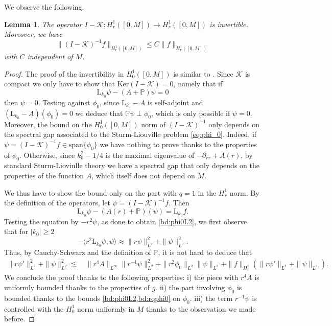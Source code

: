 \documentclass[11pt,reqno]{amsproc}
\def\de{{\partial}}
\newcommand{\rmL}{\mathrm{L}}
\newcommand{\cK}{\mathcal{K}}
\newtheorem{lemma}[proposition]{Lemma}
\theoremstyle{definition}
\theoremstyle{definition}
\numberwithin{equation}{section}
\begin{document}
 We observe the following. 
 \begin{lemma}
 \label{lemma:I-K}
     The operator $I-\cK:H^{1}_r([0,M])\to H^1_r([0,M])$ is invertible. Moreover, we have 
     \begin{equation}
     \|(I-\cK)^{-1}f\|_{H^1_r([0,M])}\leq C\|f\|_{H^1_r([0,M])}     \end{equation} with $C$ independent of $M$.
 \end{lemma}
 \begin{proof}
     The proof of the invertibility in $H^1_0([0,M])$ is similar to \cite[Lemma 3]{kumar2023simple}. Since $\cK$ is compact we only have to show that $\mathrm{Ker}(I-\cK)=0$, namely that if 
     \begin{equation}
         \rmL_{k_0}\psi-(A+\mathbb{P})\psi=0
     \end{equation}
     then $\psi=0$. Testing against $\phi_0$, since $\rmL_{k_0}-A$ is self-adjoint and $(\rmL_{k_0}-A)(\phi_0)=0$ we deduce that $\mathbb{P}\psi\perp \phi_0$, which is only possible if $\psi=0$. Moreover, the bound on the  $H^1_0([0,M])$ norm of $(I-\cK)^{-1}$ only depends on the spectral gap associated to the Sturm-Liouville problem \cref{eq:phi_0}. Indeed, if $\psi=(I-\cK)^{-1}f\in \mathrm{span}\{\phi_0\}$ we have nothing to prove thanks to the properties of $\phi_0$. Otherwise, since $k_0^2-1/4$ is the maximal eigenvalue of $-\de_{rr}+A(r)$, by standard Sturm-Lioviulle theory \cite{Kong96} we have a spectral gap that only depends on the properties of the function $A$, which itself does not depend on $M$.
     
     We thus have to show the bound only on the part with $q=1$ in the $H^1_r$ norm. By the definition of the operators,  let $\psi=(I-\cK)^{-1}f$. Then
\begin{equation}
         \rmL_{k_0}\psi-(A(r)+\mathbb{P})(\psi)=\rmL_{k_0}f.
     \end{equation}
 Testing the equation by $-r^{2}\psi$, as done to obtain \cref{bd:phi0L2}, we first observe that for $|k_0|\geq 2$
 \begin{equation}
     -\langle r^{2}\rmL_{k_0}\psi,\psi\rangle \approx \|r\psi\|_{L^2}^2+\|\psi\|_{L^2}^2.
 \end{equation}
 Thus, by Cauchy-Schwarz and the definition of $\mathbb{P}$, it is not hard to deduce that 
 \begin{align}
\|r\psi'\|_{L^2}^2+\|\psi\|_{L^2}^2\lesssim \, &\|r^4A\|_{L^\infty}\|r^{-1}\psi\|_{L^2}^2+\|r^2\phi_0\|_{L^2}\|\psi\|_{L^2}+\|f\|_{H^1_r}(\|r\psi'\|_{L^2}+\|\psi\|_{L^2}).
 \end{align}
 We conclude the proof thanks to the following properties: i)  the piece with $r^4A$ is uniformly bounded thanks to the properties of $g$. ii) the part involving $\phi_0$ is bounded thanks to the bounds \cref{bd:phi0L2,bd:rqphi0} on $\phi_0$. iii) the term $r^{-1}\psi$ is controlled with the $H^1_0$ norm uniformly in $M$ thanks to the observation we made before. 
 \end{proof}
 \medskip 
\end{document}
